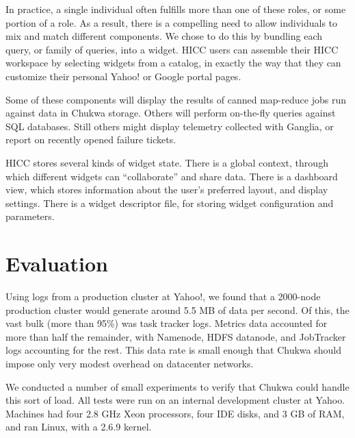 \documentclass[letterpaper,twocolumn,10pt]{article}
\begin{document}
In practice, a single individual often fulfills more than one of these roles, or some portion of a role. As a result, there is a compelling need to allow individuals to mix and match different components. We chose to do this by bundling each query, or family of queries, into a widget. HICC users can assemble their HICC workspace by selecting widgets from a catalog, in exactly the way that they can customize their personal Yahoo! or Google portal pages.

Some of these components will display the results of canned map-reduce jobs run against data in  Chukwa storage.  Others will perform on-the-fly queries against SQL databases.    Still others might display telemetry collected with Ganglia, or report on recently opened failure tickets.  

HICC stores several kinds of widget state.  There is a global context, through which different widgets can ``collaborate'' and share data. There is a dashboard view, which stores information about the user's preferred layout, and display settings.  There is a widget descriptor file, for storing widget configuration and parameters.   


\section{Evaluation}


Using logs from a production cluster at Yahoo!, we found that a 2000-node production cluster would generate around 5.5 MB of data per second.  Of this, the vast bulk (more than 95\%) was task tracker logs.  Metrics data accounted for more than half the remainder, with Namenode, HDFS datanode, and JobTracker logs accounting for the rest. This data rate is small enough that Chukwa should impose only very modest overhead on datacenter networks. 

  We conducted a number of small experiments to verify that Chukwa could handle this sort of load.   All tests were run on an internal development cluster at Yahoo.  Machines had four 2.8 GHz Xeon processors, four IDE disks, and 3 GB of RAM, and ran Linux, with a 2.6.9 kernel.  %
\end{document}
